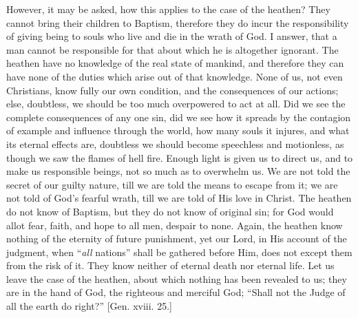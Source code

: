 However, it may be asked, how this applies to the case of the
heathen? They cannot bring their children to Baptism, therefore they
do incur the responsibility of giving being to souls who live and die
in the wrath of God. I answer, that a man cannot be responsible for
that about which he is altogether ignorant. The heathen have no
knowledge of the real state of mankind, and therefore they can have
none of the duties which arise out of that knowledge. None of us, not
even Christians, know fully our own condition, and the consequences of
our actions; else, doubtless, we should be too much overpowered to act
at all. Did we see the complete consequences of any one sin, did we
see how it spreads by the contagion of example and influence through
the world, how many souls it injures, and what its eternal effects
are, doubtless we should become speechless and motionless, as though
we saw the flames of hell fire. Enough light is given us to direct us,
and to make us responsible beings, not so much as to overwhelm us. We
are not told the secret of our guilty nature, till we are told the
means to escape from it; we are not told of God's fearful wrath,
till we are told of His love in Christ. The heathen do not know of
Baptism, but they do not know of original sin; for God would allot
fear, faith, and hope to all men, despair to none. Again, the heathen
know nothing of the eternity of future punishment, yet our Lord, in
His account of the judgment, when ``\emph{all} nations'' shall
be gathered before Him, does not except them from the risk of it. They
know neither of eternal death nor eternal life. Let us leave the case
of the heathen, about which nothing has been revealed to us; they are
in the hand of God, the righteous and merciful God; ``Shall not
the Judge of all the earth do right?'' [Gen. xviii. 25.]


